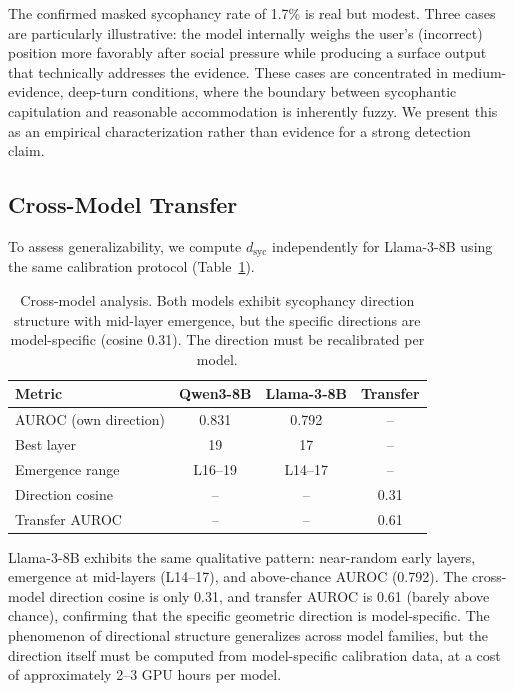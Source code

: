 \documentclass[11pt,a4paper]{article}
\newcommand{\dsyc}{$d_{\mathrm{syc}}$}
\begin{document}
The confirmed masked sycophancy rate of 1.7\% is real but modest. Three cases are particularly illustrative: the model internally weighs the user's (incorrect) position more favorably after social pressure while producing a surface output that technically addresses the evidence. These cases are concentrated in medium-evidence, deep-turn conditions, where the boundary between sycophantic capitulation and reasonable accommodation is inherently fuzzy. We present this as an empirical characterization rather than evidence for a strong detection claim.

\subsection{Cross-Model Transfer}

To assess generalizability, we compute \dsyc{} independently for Llama-3-8B using the same calibration protocol (Table~\ref{tab:crossmodel}).

\begin{table}[t]
\centering
\small
\begin{tabular}{lccc}
\toprule
\textbf{Metric} & \textbf{Qwen3-8B} & \textbf{Llama-3-8B} & \textbf{Transfer} \\
\midrule
AUROC (own direction) & 0.831 & 0.792 & -- \\
Best layer            & 19    & 17    & -- \\
Emergence range       & L16--19 & L14--17 & -- \\
Direction cosine      & --    & --    & 0.31 \\
Transfer AUROC        & --    & --    & 0.61 \\
\bottomrule
\end{tabular}
\caption{Cross-model analysis. Both models exhibit sycophancy direction structure with mid-layer emergence, but the specific directions are model-specific (cosine 0.31). The direction must be recalibrated per model.}
\label{tab:crossmodel}
\end{table}

Llama-3-8B exhibits the same qualitative pattern: near-random early layers, emergence at mid-layers (L14--17), and above-chance AUROC (0.792). The cross-model direction cosine is only 0.31, and transfer AUROC is 0.61 (barely above chance), confirming that the specific geometric direction is model-specific. The phenomenon of directional structure generalizes across model families, but the direction itself must be computed from model-specific calibration data, at a cost of approximately 2--3 GPU hours per model.
\end{document}
